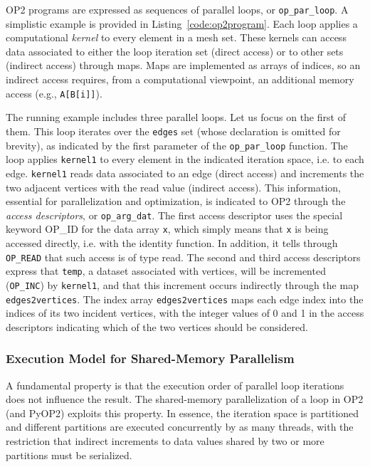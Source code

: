 OP2 programs are expressed as sequences of parallel loops, or {\tt op\_par\_loop}. A simplistic example is provided in Listing~\ref{code:op2program}. Each loop applies a computational {\em kernel} to every element in a mesh set. These kernels can access data associated to either the loop iteration set (direct access) or to other sets (indirect access) through maps. Maps are implemented as arrays of indices, so an indirect access requires, from a computational viewpoint, an additional memory access (e.g., \texttt{A[B[i]]}).

The running example includes three parallel loops. Let us focus on the first of them. This loop iterates over the {\tt edges} set (whose declaration is omitted for brevity), as indicated by the first parameter of the {\tt op\_par\_loop} function. The loop applies {\tt kernel1} to every element in the indicated iteration space, i.e. to each edge. {\tt kernel1} reads data associated to an edge (direct access) and increments the two adjacent vertices with the read value (indirect access). This information, essential for parallelization and optimization, is indicated to OP2 through the {\em access descriptors}, or {\tt op\_arg\_dat}. The first access descriptor uses the special keyword OP\_ID for the data array {\tt x}, which simply means that {\tt x} is being accessed directly, i.e. with the identity function. In addition, it tells through {\tt OP\_READ} that such access is of type read. The second and third access descriptors express that {\tt temp}, a dataset associated with vertices, will be incremented ({\tt OP\_INC}) by {\tt kernel1}, and that this increment occurs indirectly through the map {\tt edges2vertices}. The index array {\tt edges2vertices} maps each edge index into the indices of its two incident vertices, with the integer values of 0 and 1 in the access descriptors indicating which of the two vertices should be considered.


\subsubsection{Execution Model for Shared-Memory Parallelism}
A fundamental property is that the execution order of parallel loop iterations does not influence the result. The shared-memory parallelization of a loop in OP2 (and PyOP2) exploits this property. In essence, the iteration space is partitioned and different partitions are executed concurrently by as many threads, with the restriction that indirect increments to data values shared by two or more partitions must be serialized.

